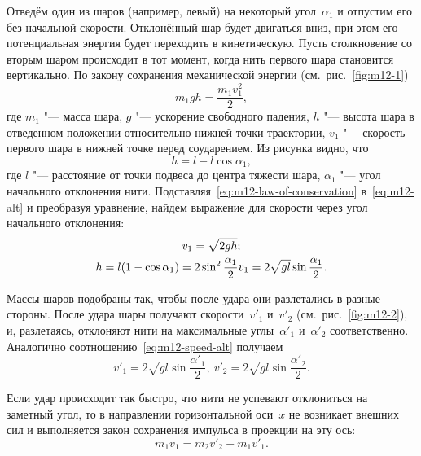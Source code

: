 \documentclass[a4paper, 12pt]{extarticle}
\begin{document}
Отведём один из шаров (например, левый) на  некоторый угол~$\alpha_1$ и отпустим его без начальной скорости. Отклонённый шар будет двигаться  вниз, при этом его потенциальная энергия будет переходить в кинетическую. Пусть столкновение со вторым шаром происходит в тот момент, когда нить первого шара становится вертикально. По закону сохранения механической энергии (см.~рис.~\ref{fig:m12-1})
\begin{equation}
\label{eq:m12-law-of-conservation}
m_1 g h = \frac{m_1 v_1^2}{2},
\end{equation}
где $m_1$ "--- масса шара, $g$ "--- ускорение свободного падения, $h$ "--- высота шара в отведенном  положении относительно нижней точки траектории, $v_1$ "--- скорость первого шара в нижней точке перед соударением. %
Из рисунка видно, что
\begin{equation}
\label{eq:m12-alt}
h = l - l \cos \alpha_1,
\end{equation}
где $l$ "--- расстояние от точки подвеса до центра тяжести шара, $\alpha_1$ "--- угол начального отклонения нити. Подставляя~\eqref{eq:m12-law-of-conservation} в~\eqref{eq:m12-alt} и преобразуя уравнение, найдем выражение для скорости через угол начального отклонения: %
\begin{equation}
\label{eq:m12-speed-alt}
\gathered
v_1 = \sqrt{2gh}; \\
h = l (1 - \cos \alpha_1) = 2 \sin^2 \frac{\alpha_1}{2} v_1 = 2 \sqrt{gl} \sin \frac{\alpha_1}{2}.
\endgathered
\end{equation}

Массы шаров подобраны так, чтобы после удара они разлетались в разные стороны. После удара шары получают скорости~$v'_1$  и~$v'_2$  (см.~рис.~\ref{fig:m12-2}), и, разлетаясь, отклоняют нити на максимальные углы~$\alpha'_1$ и~$\alpha'_2$ соответственно. Аналогично соотношению~\eqref{eq:m12-speed-alt} получаем
\begin{equation}
\label{eq:m12-final-speed}
v'_1 = 2 \sqrt{gl} \sin \frac{\alpha'_1}{2}, \ v'_2 = 2 \sqrt{gl} \sin \frac{\alpha'_2}{2}.
\end{equation}

Если удар происходит так быстро, что нити не успевают отклониться на заметный угол, то в направлении горизонтальной оси~$x$ не возникает внешних сил и выполняется закон сохранения импульса в проекции на эту ось: %
\begin{equation}
\label{eq:m12-momentum}
m_1 v_1 = m_2 v'_2 - m_1 v'_1.
\end{equation}
\end{document}
